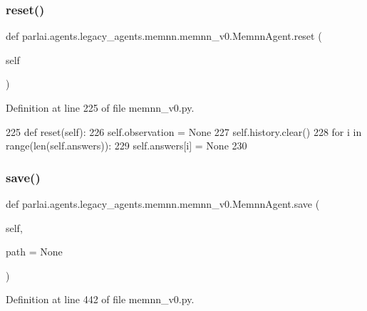 \subsubsection{\texorpdfstring{reset()}{reset()}}
{\footnotesize\ttfamily def parlai.\+agents.\+legacy\+\_\+agents.\+memnn.\+memnn\+\_\+v0.\+Memnn\+Agent.\+reset (\begin{DoxyParamCaption}\item[{}]{self }\end{DoxyParamCaption})}



Definition at line 225 of file memnn\+\_\+v0.\+py.


\begin{DoxyCode}
225     \textcolor{keyword}{def }reset(self):
226         self.observation = \textcolor{keywordtype}{None}
227         self.history.clear()
228         \textcolor{keywordflow}{for} i \textcolor{keywordflow}{in} range(len(self.answers)):
229             self.answers[i] = \textcolor{keywordtype}{None}
230 
\end{DoxyCode}
\mbox{\label{classparlai_1_1agents_1_1legacy__agents_1_1memnn_1_1memnn__v0_1_1MemnnAgent_a20509f6931e68ff52e965d3e214c7b0a}} 
\subsubsection{\texorpdfstring{save()}{save()}}
{\footnotesize\ttfamily def parlai.\+agents.\+legacy\+\_\+agents.\+memnn.\+memnn\+\_\+v0.\+Memnn\+Agent.\+save (\begin{DoxyParamCaption}\item[{}]{self,  }\item[{}]{path = {\ttfamily None} }\end{DoxyParamCaption})}



Definition at line 442 of file memnn\+\_\+v0.\+py.


